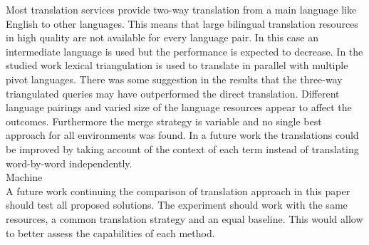 \documentclass[journal]{IEEEtran}
\begin{document}
Most translation services provide two-way translation from a main language like English to other languages.
This means that large bilingual translation resources in high quality are not available for every language pair.
In this case an intermediate language is used but the performance is expected to decrease.
In the studied work lexical triangulation is used to translate in parallel with multiple pivot languages.
There was some suggestion in the results that the three-way triangulated queries may have outperformed the direct translation.
Different language pairings and varied size of the language resources appear to affect the outcomes.
Furthermore the merge strategy is variable and no single best approach for all environments was found.
In a future work the translations could be improved by taking account of the context of each term instead of translating word-by-word independently.
\mbox{}\\

Machine
\mbox{}\\

A future work continuing the comparison of translation approach in this paper should test all proposed solutions.
The experiment should work with the same resources, a common translation strategy and an equal baseline.
This would allow to better assess the capabilities of each method.



\end{document}
